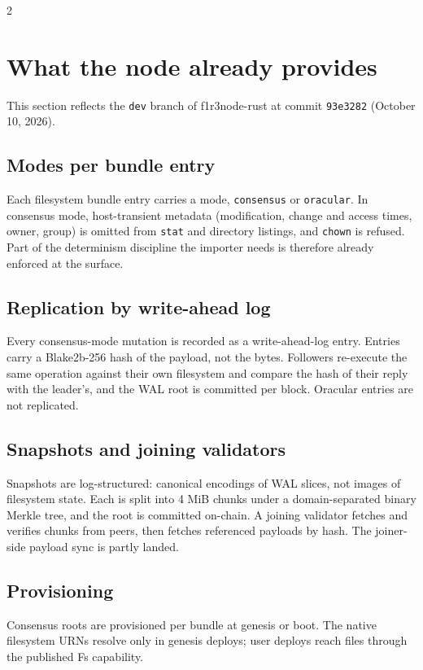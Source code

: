 \documentclass[10pt]{article}
\begin{document}
\begin{multicols}{2}

\section{What the node already provides}

This section reflects the \texttt{dev} branch of f1r3node-rust at commit
\texttt{93e3282} (October 10, 2026).

\subsection{Modes per bundle entry}
Each filesystem bundle entry carries a mode, \texttt{consensus} or
\texttt{oracular}. In consensus mode, host-transient metadata (modification,
change and access times, owner, group) is omitted from \texttt{stat} and directory
listings, and \texttt{chown} is refused. Part of the determinism discipline the
importer needs is therefore already enforced at the surface.

\subsection{Replication by write-ahead log}
Every consensus-mode mutation is recorded as a write-ahead-log entry. Entries
carry a Blake2b-256 hash of the payload, not the bytes. Followers re-execute the
same operation against their own filesystem and compare the hash of their reply
with the leader's, and the WAL root is committed per block. Oracular entries are
not replicated.

\subsection{Snapshots and joining validators}
Snapshots are log-structured: canonical encodings of WAL slices, not images of
filesystem state. Each is split into 4 MiB chunks under a domain-separated binary
Merkle tree, and the root is committed on-chain. A joining validator fetches and
verifies chunks from peers, then fetches referenced payloads by hash. The
joiner-side payload sync is partly landed.

\subsection{Provisioning}
Consensus roots are provisioned per bundle at genesis or boot. The native
filesystem URNs resolve only in genesis deploys; user deploys reach files through
the published Fs capability.


\end{multicols}
\end{document}
